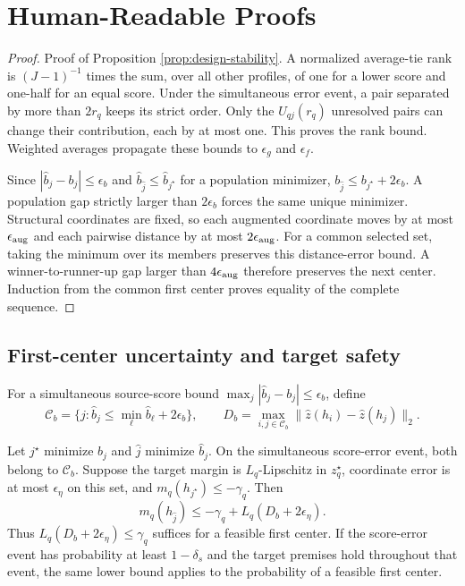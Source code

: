 \FloatBarrier
\section{Human-Readable Proofs}\label{app:proofs}

\begin{proof}{Proof of Proposition \ref{prop:design-stability}.}
A normalized average-tie rank is $(J-1)^{-1}$ times the sum, over all other
profiles, of one for a lower score and one-half for an equal score.  Under the
simultaneous error event, a pair separated by more than $2r_q$ keeps its strict
order.  Only the $U_{qj}(r_q)$ unresolved pairs can change their contribution,
each by at most one.  This proves the rank bound.  Weighted averages propagate
these bounds to $\epsilon_g$ and $\epsilon_f$.

Since $|\widehat b_j-b_j|\le\epsilon_b$ and
$\widehat b_{\widehat j}\le\widehat b_{j^\star}$ for a population minimizer,
$b_{\widehat j}\le b_{j^\star}+2\epsilon_b$.  A population gap strictly
larger than $2\epsilon_b$ forces the same unique minimizer.  Structural
coordinates are fixed, so each augmented coordinate moves by at most
$\epsilon_{\rm aug}$ and each pairwise distance by at most
$2\epsilon_{\rm aug}$.
For a common selected set, taking the minimum over its members preserves this
distance-error bound.  A winner-to-runner-up gap larger than
$4\epsilon_{\rm aug}$ therefore preserves the next center.  Induction from the
common first center proves equality of the complete sequence.
\Halmos
\end{proof}

\subsection{First-center uncertainty and target safety}

For a simultaneous source-score bound
$\max_j|\widehat b_j-b_j|\le\epsilon_b$, define
\[
 \mathcal C_b=\{j:\widehat b_j\le\min_\ell\widehat b_\ell+2\epsilon_b\},
 \qquad D_b=\max_{i,j\in\mathcal C_b}
 \|\widehat z(h_i)-\widehat z(h_j)\|_2.
\]

\begin{proposition}\label{prop:first-center-transfer}
Let $j^\star$ minimize $b_j$ and $\widehat j$ minimize $\widehat b_j$.
On the simultaneous score-error event, both belong to $\mathcal C_b$.
Suppose the target margin is $L_q$-Lipschitz in $z_q^\star$, coordinate
error is at most $\epsilon_\eta$ on this set, and
$m_q(h_{j^\star})\le-\gamma_q$.  Then
\[
 m_q(h_{\widehat j})\le-\gamma_q+L_q(D_b+2\epsilon_\eta).
\]
Thus $L_q(D_b+2\epsilon_\eta)\le\gamma_q$ suffices for a feasible first
center.  If the score-error event has probability at least $1-\delta_s$
and the target premises hold throughout that event, the same lower bound
applies to the probability of a feasible first center.
\end{proposition}

